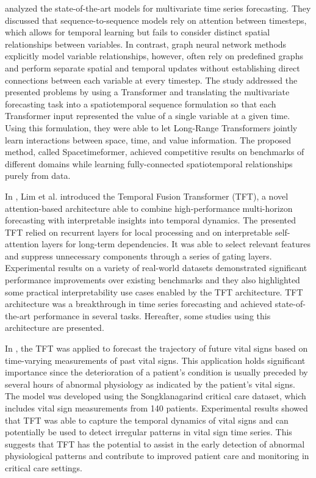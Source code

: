 \cite{Grigsby2021} analyzed the state-of-the-art models for multivariate time series forecasting.
They discussed that sequence-to-sequence models rely on attention between timesteps, which allows for temporal learning but fails to consider distinct spatial relationships between variables.
In contrast, graph neural network methods explicitly model variable relationships, however, often rely on predefined graphs and perform separate spatial and temporal updates without establishing direct connections between each variable at every timestep.
The study addressed the presented problems by using a Transformer and translating the multivariate forecasting task into a spatiotemporal sequence formulation so that each Transformer input represented the value of a single variable at a given time.
Using this formulation, they were able to let Long-Range Transformers jointly learn interactions between space, time, and value information.
The proposed method, called Spacetimeformer, achieved competitive results on benchmarks of different domains while learning fully-connected spatiotemporal relationships purely from data.

In \cite{LIM20211748}, Lim et al. introduced the Temporal Fusion Transformer (TFT), a novel attention-based architecture able to combine high-performance multi-horizon forecasting with interpretable insights into temporal dynamics.
The presented TFT relied on recurrent layers for local processing and on interpretable self-attention layers for long-term dependencies.
It was able to select relevant features and suppress unnecessary components through a series of gating layers.
Experimental results on a variety of real-world datasets demonstrated significant performance improvements over existing benchmarks and they also highlighted some practical interpretability use cases enabled by the TFT architecture.
TFT architecture was a breakthrough in time series forecasting and achieved state-of-the-art performance in several tasks.
Hereafter, some studies using this architecture are presented.

In \cite{9745215}, the TFT was applied to forecast the trajectory of future vital signs based on time-varying measurements of past vital signs.
This application holds significant importance since the deterioration of a patient's condition is usually preceded by several hours of abnormal physiology as indicated by the patient's vital signs.
The model was developed using the Songklanagarind critical care dataset, which includes vital sign measurements from 140 patients.
Experimental results showed that TFT was able to capture the temporal dynamics of vital signs and can potentially be used to detect irregular patterns in vital sign time series.
This suggests that TFT has the potential to assist in the early detection of abnormal physiological patterns and contribute to improved patient care and monitoring in critical care settings.

